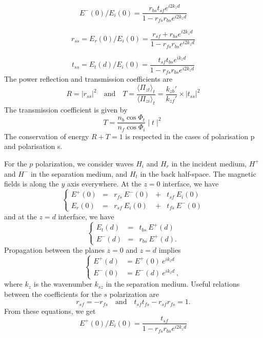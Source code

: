 \begin{equation*}
E^-(0) / E_i(0) =\frac{r_{bs} t_{sf} e^{i2k_z d}}{1-r_{fs}r_{bs}e^{i2k_z d}}
\end{equation*}

\begin{equation*}\label{eq:reflectivewave}
r_{ss} = E_r(0) / E_i(0) =
\frac{r_{sf} + r_{bs} e^{i2k_z d}}{1-r_{fs}r_{bs}e^{i2k_z d}}
\end{equation*}

\begin{equation*}\label{eq:transmittedwave}
t_{ss} = E_t(d) / E_i(0) =
\frac{t_{sf} t_{bs} e^{ik_z d}}{1 - r_{fs}r_{bs}e^{i2k_z d}}
\end{equation*}
The power reflection and transmission coefficients are
$$
R = |r_{ss}|^2
\quad\textrm{and}\quad
T = \frac{\langle \Pi_{zt} \rangle_t}{\langle \Pi_{zi} \rangle_t} 
= \frac{k_{zb}'}{k_{zf}'} \times |t_{ss}|^2
$$
The transmission coefficient is given by
\begin{equation*}
T=\frac{n_b\cos\Phi _t}{n_f\cos\Phi _i}\mid t\mid^2
\end{equation*}
The conservation of energy $R+T=1$ is respected in the cases of polarisation p and polarisation s.




For the $p$ polarization, we consider waves $H_i$ and $H_r$ in the incident medium, $H^+$ and $H^-$ in the separation medium, and $H_t$ in the back half-space.
The magnetic fields is along the $y$ axis everywhere.
At the $z=0$ interface, we have
\begin{equation*}
\left\{
\begin{array}{lllll}\label{eq:continuity0}
E^+(0)  & = & r_{fs}\ E^-(0)  & + & t_{sf}\ E_i(0)    \\
E_r(0)  & = & r_{sf}\ E_i(0)  & + & t_{fs}\ E^-(0)
\end{array}\right.
\end{equation*}
and at the $z=d$ interface, we have
\begin{equation*}
\left\{
\begin{array}{lll}\label{eq:continuityd}
E_t(d)  & = & t_{bs}\ E^+(d)  \\
E^-(d)  & = & r_{bs}\ E^+(d).
\end{array}\right.
\end{equation*}
Propagation between the planes $z=0$ and $z=d$ implies
\begin{equation*}
\left\{
\begin{array}{lll}\label{eq:0tod}
E^+(d) & = E^+(0)\ e^{ik_z d}\\
E^-(0) & = E^-(d)\ e^{ik_z d} \ ,
\end{array}\right.
\end{equation*}
where $k_z$ is the wavenumber $k_{sz}$ in the separation medium.
Useful relations between the coefficients for the $s$ polarization are 
$$ 
r_{sf} = - r_{fs} 
\quad\textrm{and}\quad
t_{sf} t_{fs} - r_{sf} r_{fs} = 1. 
$$
From these equations, we get
\begin{equation*}
E^+(0) / E_i(0) =\frac{t_{sf}}{1 - r_{fs}r_{bs}e^{i2k_z d}}
\end{equation*}

